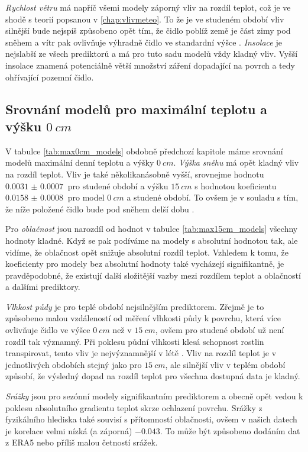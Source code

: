 \textit{Rychlost větru} má napříč všemi modely záporný vliv na rozdíl teplot, což je ve shodě s teorií popsanou v \ref{chap:vlivmeteo}. To že je ve studeném období vliv silnější bude nejspíš způsobeno opět tím, že čidlo poblíž země je část zimy pod sněhem a vítr pak ovlivňuje výhradně čidlo ve standardní výšce \parencite{wind_contrastingmicroclimates}. \textit{Insolace} je nejslabší ze všech prediktorů a má pro tuto sadu modelů vždy kladný vliv. Vyšší insolace znamená potenciálně větší množství záření dopadající na povrch a tedy ohřívající pozemní čidlo.

\subsection{Srovnání modelů pro maximální teplotu a výšku $\SI{0}{cm}$}
V tabulce \ref{tab:max0cm_models} obdobně předchozí kapitole máme srovnání modelů maximální denní teplotu a výšky $\SI{0}{cm}$. \textit{Výška sněhu} má opět kladný vliv na rozdíl teplot. Vliv je také několikanásobně vyšší, srovnejme hodnotu $\SI{0.0031(7)}{}$ pro studené období a výšku $\SI{15}{cm}$ s hodnotou koeficientu $\SI{0.0158(8)}{}$ pro model $\SI{0}{cm}$ a studené období. To ovšem je v souladu s tím, že níže položené čidlo bude pod sněhem delší dobu \parencite{snow_deFrenneForestMicroclimates}.

Pro \textit{oblačnost} jsou narozdíl od hodnot v tabulce \ref{tab:max15cm_models} všechny hodnoty kladné. Když se pak podíváme na modely s absolutní hodnotou tak, ale vidíme, že oblačnost opět snižuje absolutní rozdíl teplot. Vzhledem k tomu, že koeficienty pro modely bez absolutní hodnoty také vycházejí signifikantně, je pravděpodobné, že existují další složitější vazby mezi rozdílem teplot a oblačností a dalšími prediktory.

\textit{Vlhkost půdy} je pro teplé období nejsilnějším prediktorem. Zřejmě je to způsobeno malou vzdáleností od měření vlhkosti půdy k povrchu, která více ovlivňuje čidlo ve výšce $\SI{0}{cm}$ než v $\SI{15}{cm}$, ovšem pro studené období už není rozdíl tak významný. Při poklesu půdní vlhkosti klesá schopnost rostlin transpirovat, tento vliv je nejvýznamnější v létě \parencite{snow_deFrenneForestMicroclimates}. Vliv na rozdíl teplot je v jednotlivých obdobích stejný jako pro $\SI{15}{cm}$, ale silnější vliv v teplém období způsobí, že výsledný dopad na rozdíl teplot pro všechna dostupná data je kladný.

\textit{Srážky} jsou pro sezónní modely signifikantním prediktorem a obecně opět vedou k poklesu absolutního gradientu teplot skrze ochlazení povrchu. Srážky z fyzikálního hlediska také souvisí s přítomností oblačnosti, ovšem v našich datech je korelace velmi nízká (a záporná) $-0.043$. To může být způsobeno dodáním dat z ERA5 nebo příliš malou četností srážek.

